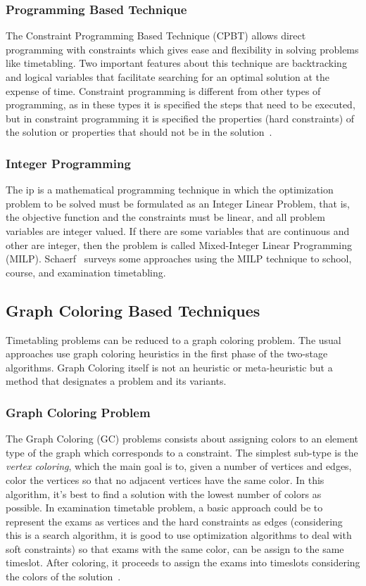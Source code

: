 \subsubsection{Programming Based Technique}
The Constraint Programming Based Technique (CPBT) allows direct programming with constraints which gives ease and flexibility in solving problems like timetabling. Two important features about this technique are backtracking and logical variables that facilitate searching for an optimal solution at the expense of time. Constraint programming is different from other types of programming, as in these types it is specified the steps that need to be executed, but in constraint programming it is specified the properties (hard constraints) of the solution or properties that should not be in the solution~\cite{Qu2009}.\\

\subsubsection{Integer Programming}
The \gls{ip} is a mathematical programming technique in which the optimization problem to be solved must be formulated as an Integer Linear Problem, that is, the objective function and the constraints must be linear, and all problem variables are integer valued. If there are some variables that are continuous and other are integer, then the problem is called Mixed-Integer Linear Programming (MILP). Schaerf~\cite{Schaerf1999} surveys some approaches using the MILP technique to school, course, and examination timetabling.

\subsection{Graph Coloring Based Techniques}
\label{subsection:graphcoloring}
Timetabling problems can be reduced to a graph coloring problem. The usual approaches use graph coloring heuristics in the first phase of the two-stage algorithms. Graph Coloring itself is not an heuristic or meta-heuristic but a method that designates a problem and its variants.\\

\subsubsection{Graph Coloring Problem}
The Graph Coloring (GC) problems consists about assigning colors to an element type of the graph which corresponds to a constraint. The simplest sub-type is the \textit{vertex coloring}, which the main goal is to, given a number of vertices and edges, color the vertices so that no adjacent vertices have the same color. In this algorithm, it's best to find a solution with the lowest number of colors as possible. In examination timetable problem, a basic approach could be to represent the exams as vertices and the hard constraints as edges (considering this is a search algorithm, it is good to use optimization algorithms to deal with soft constraints) so that exams with the same color, can be assign to the same timeslot. After coloring, it proceeds to assign the exams into timeslots considering the colors of the solution~\cite{Qu2009}.\\


